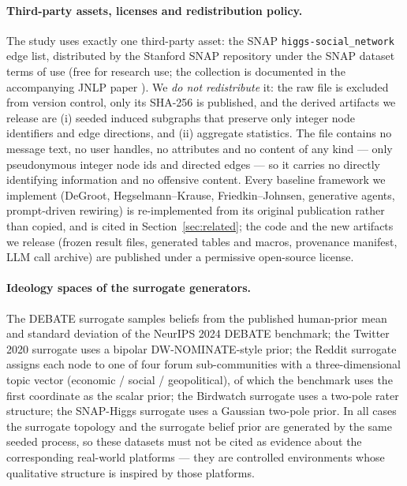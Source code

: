 \paragraph{Third-party assets, licenses and redistribution policy.}
The study uses exactly one third-party asset: the SNAP \texttt{higgs-social\_network} edge list,
distributed by the Stanford SNAP repository under the SNAP dataset terms of use (free for
research use; the collection is documented in the accompanying JNLP paper \citep{domenico2013anatomy}).
We \emph{do not redistribute} it: the raw file is excluded from version control, only its SHA-256
is published, and the derived artifacts we release are (i) seeded induced subgraphs that preserve
only integer node identifiers and edge directions, and (ii) aggregate statistics. The file contains
no message text, no user handles, no attributes and no content of any kind --- only pseudonymous
integer node ids and directed edges --- so it carries no directly identifying information and no
offensive content. Every baseline framework we implement (DeGroot, Hegselmann--Krause,
Friedkin--Johnsen, generative agents, prompt-driven rewiring) is re-implemented from its original
publication rather than copied, and is cited in Section~\ref{sec:related}; the code and the new
artifacts we release (frozen result files, generated tables and macros, provenance manifest, LLM
call archive) are published under a permissive open-source license.

\paragraph{Ideology spaces of the surrogate generators.}
The DEBATE surrogate samples beliefs from the published human-prior mean and standard deviation of
the NeurIPS 2024 DEBATE benchmark; the Twitter 2020 surrogate uses a bipolar DW-NOMINATE-style
prior; the Reddit surrogate assigns each node to one of four forum sub-communities with a
three-dimensional topic vector (economic / social / geopolitical), of which the benchmark uses the
first coordinate as the scalar prior; the Birdwatch surrogate uses a two-pole rater structure; the
SNAP-Higgs surrogate uses a Gaussian two-pole prior. In all cases the surrogate topology and the
surrogate belief prior are generated by the same seeded process, so these datasets must not be
cited as evidence about the corresponding real-world platforms --- they are controlled
environments whose qualitative structure is inspired by those platforms.

\begin{table}[t]
\centering
\small
\setlength{\tabcolsep}{4.5pt}
\caption{\textbf{Measured Topological Characteristics of the Six Integrated Benchmark Networks.}
Generated by \texttt{scripts/generate\_paper\_tables.py} directly from the cached graphs consumed by
the benchmark suite. $r$ is the directed reciprocity $2\,\#\mathrm{mutual}/|E|$; $Q_0$ and $K_0$ are
the modularity and the number of communities of the Louvain partition of the \emph{initial}
topology, and $K_0$ is the quantity that bounds $Q$ through $Q \leq 1-1/K$ (Proposition~1).}
\label{tab:dataset_metrics}

\end{table}

